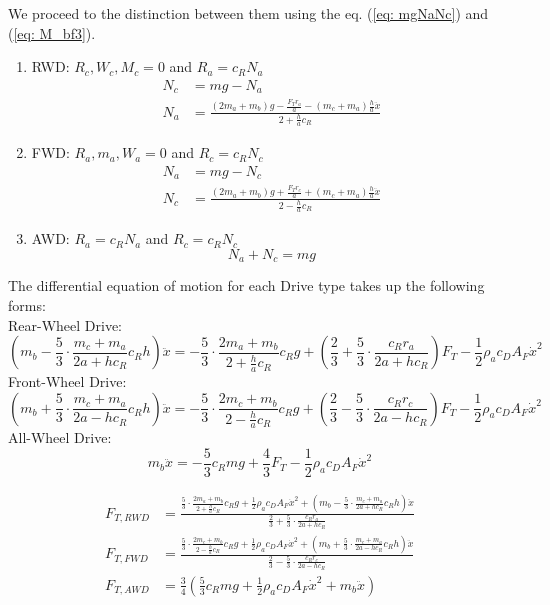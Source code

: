 We proceed to the distinction between them using the eq. (\ref{eq: mgNaNc}) and (\ref{eq: M_bf3}).
\begin{enumerate}
    \item RWD: $R_c, W_c, M_c = 0$ and $R_a=c_RN_a$
        \begin{align} \nonumber
            N_c & = mg - N_a\\ \label{eq: FWD_Na}
            N_a & = \frac{(2m_a + m_b)g - \frac{F_Tr_a}{a} - (m_c+m_a)\frac{h}{a}\ddot x}{2+\frac{h}{a}c_R}
        \end{align}
    \item FWD: $R_a, m_a, W_a = 0$ and $R_c=c_RN_c$
        \begin{align} \nonumber
            N_a & = mg - N_c\\ \label{eq: FWD_Nc}
            N_c & = \frac{(2m_a + m_b)g + \frac{F_Tr_c}{a} + (m_c+m_a)\frac{h}{a}\ddot x}{2-\frac{h}{a}c_R}
		\end{align}
        
    \item AWD: $R_a=c_RN_a$ and $R_c=c_RN_c$
        \begin{equation}
            N_a + N_c  = mg \label{eq: AWD_Nac}
        \end{equation}
\end{enumerate}
The differential equation of motion for each Drive type takes up the following forms:
\\
Rear-Wheel Drive:
\begin{equation}
    \left(m_b - \frac{5}{3}\cdot\frac{m_c+m_a}{2a + hc_R}c_Rh\right)\ddot x  = -\frac{5}{3}\cdot\frac{2m_a + m_b}{2 + \frac{h}{a}c_R}c_Rg + \left(\frac{2}{3} + \frac{5}{3}\cdot\frac{c_Rr_a}{2a+hc_R}\right)F_T - \frac{1}{2}\rho_a c_D A_F \dot x^2
\end{equation}
Front-Wheel Drive:
\begin{equation}
	\left(m_b + \frac{5}{3}\cdot\frac{m_c+m_a}{2a - hc_R}c_Rh\right)\ddot x  = -\frac{5}{3}\cdot\frac{2m_c + m_b}{2 - \frac{h}{a}c_R}c_Rg + \left(\frac{2}{3} - \frac{5}{3}\cdot\frac{c_Rr_c}{2a-hc_R}\right)F_T - \frac{1}{2}\rho_a c_D A_F \dot x^2
\end{equation}
All-Wheel Drive:
\begin{equation}
    m_b\ddot x = -\frac{5}{3}c_Rmg + \frac{4}{3}F_T - \frac{1}{2}\rho_a c_D A_F \dot x^2
\end{equation}

\begin{align*}
	F_{T,RWD} & = \frac{\frac{5}{3}\cdot\frac{2m_a + m_b}{2 + \frac{h}{a}c_R}c_Rg + \frac{1}{2}\rho_a c_D A_F \dot x^2 + \left(m_b - \frac{5}{3}\cdot\frac{m_c+m_a}{2a + hc_R}c_Rh\right)\ddot x}{\frac{2}{3} + \frac{5}{3}\cdot\frac{c_Rr_a}{2a+hc_R}}\\
	F_{T,FWD} & = \frac{ \frac{5}{3}\cdot\frac{2m_c + m_b}{2 - \frac{h}{a}c_R}c_Rg + \frac{1}{2}\rho_a c_D A_F \dot x^2 + \left(m_b + \frac{5}{3}\cdot\frac{m_c+m_a}{2a - hc_R}c_Rh\right)\ddot x}{\frac{2}{3} - \frac{5}{3}\cdot\frac{c_Rr_c}{2a-hc_R}}\\
	F_{T,AWD} & = \frac{3}{4}\left(\frac{5}{3}c_Rmg  + \frac{1}{2}\rho_a c_D A_F \dot x^2 + m_b\ddot x\right)
\end{align*}

